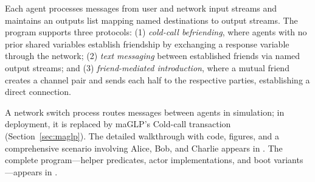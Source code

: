 Each agent processes messages from user and network input streams and maintains an outputs list mapping named destinations to output streams. The program supports three protocols: (1) \emph{cold-call befriending}, where agents with no prior shared variables establish friendship by exchanging a response variable through the network; (2) \emph{text messaging} between established friends via named output streams; and (3) \emph{friend-mediated introduction}, where a mutual friend creates a channel pair and sends each half to the respective parties, establishing a direct connection.

A network switch process routes messages between agents in simulation; in deployment, it is replaced by maGLP's Cold-call transaction (Section~\ref{sec:maglp}). The detailed walkthrough with code, figures, and a comprehensive scenario involving Alice, Bob, and Charlie appears in . The complete program---helper predicates, actor implementations, and boot variants---appears in .
